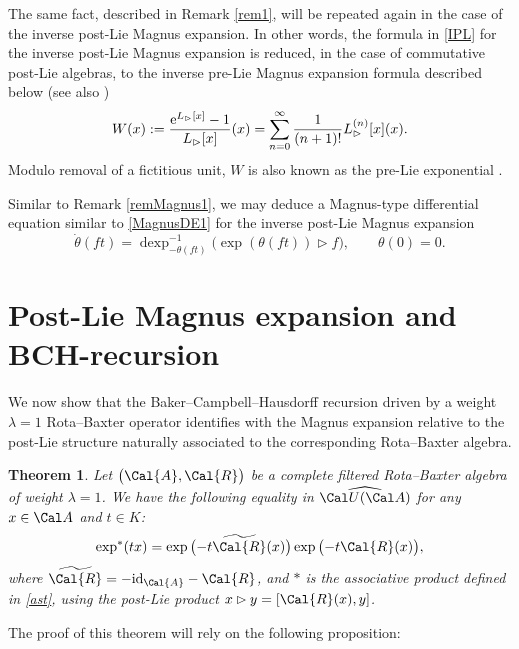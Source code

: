 \documentclass[pdftex]{sigma}
\numberwithin{equation}{section}
\newtheorem{Theorem}{Theorem}[section]
\begin{document}
\begin{Remark}
The same fact, described in Remark \ref{rem1}, will be repeated again in the case of the inverse post-Lie Magnus expansion. In other words, the formula in \eqref{IPL} for the inverse post-Lie Magnus expansion is reduced, in the case of commutative post-Lie algebras, to the inverse pre-Lie Magnus expansion formula described below (see also \cite{KM08,AL2011})
\begin{gather*}
W(x) := \frac{{\rm e}^{L_{\rhd}[x]} - 1}{L_{\rhd}[x]}(x) = \sum_{n=0}^{\infty}\frac{1}{(n+1)!} L^{(n)}_{\rhd}[x](x).
\end{gather*}
Modulo removal of a fictitious unit, $W$ is also known as the pre-Lie exponential \cite{AG81}.
\end{Remark}

\begin{Remark}%
Similar to Remark \ref{remMagnus1}, we may deduce a Magnus-type differential equation similar to \eqref{MagnusDE1} for the inverse post-Lie Magnus expansion \cite{ELM2015,EIM2017}
\begin{displaymath}
\dot{\theta}(ft) = \operatorname{dexp}^{-1}_{- \theta(ft)}\big( \exp(\theta(ft)) \rhd f \big), \qquad \theta(0)=0.
\end{displaymath}
\end{Remark}

\section{Post-Lie Magnus expansion and BCH-recursion}\label{s4}

We now show that the Baker--Campbell--Hausdorff recursion driven by a weight $\lambda=1$ Rota--Baxter operator identifies with the Magnus expansion relative to the post-Lie structure naturally associated to the corresponding Rota--Baxter algebra.

\begin{Theorem}\label{T9}
Let $\big(\Cal{A}, \Cal{R}\big)$ be a complete filtered Rota--Baxter algebra of weight $\lambda = 1$. We have the following equality in $\widehat{\Cal U(\Cal A)}$ for any $x\in\Cal A$ and $t \in K$:
\begin{equation}\label{ET9}
\exp^{\ast}(tx) = \exp\big({-}t \widetilde{\Cal{R}}(x)\big) \exp\big({-}t \Cal{R}(x)\big),
\end{equation}
where $\widetilde{\Cal{R}}= -{\rm id}_{\Cal{A}}-\Cal{R}$, and $\ast$ is the associative product defined in \eqref{ast}, using the post-Lie product $x \rhd y = [\Cal{R}(x), y]$.
\end{Theorem}
 The proof of this theorem will rely on the following proposition:
\end{document}
